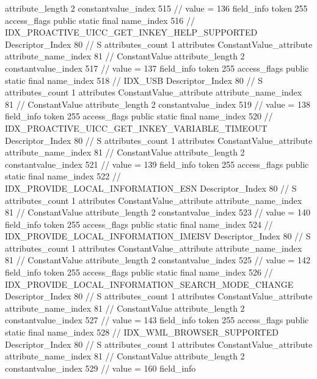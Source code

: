 {{{{{{{					attribute_length	2
					constantvalue_index	515		// value = 136
				}
				}
			}
			field_info {
				token	255
				access_flags	public static final
				name_index	516		// IDX_PROACTIVE_UICC_GET_INKEY_HELP_SUPPORTED
				Descriptor_Index	80		// S
				attributes_count	1
				attributes {
				ConstantValue_attribute {
					attribute_name_index	81		// ConstantValue
					attribute_length	2
					constantvalue_index	517		// value = 137
				}
				}
			}
			field_info {
				token	255
				access_flags	public static final
				name_index	518		// IDX_USB
				Descriptor_Index	80		// S
				attributes_count	1
				attributes {
				ConstantValue_attribute {
					attribute_name_index	81		// ConstantValue
					attribute_length	2
					constantvalue_index	519		// value = 138
				}
				}
			}
			field_info {
				token	255
				access_flags	public static final
				name_index	520		// IDX_PROACTIVE_UICC_GET_INKEY_VARIABLE_TIMEOUT
				Descriptor_Index	80		// S
				attributes_count	1
				attributes {
				ConstantValue_attribute {
					attribute_name_index	81		// ConstantValue
					attribute_length	2
					constantvalue_index	521		// value = 139
				}
				}
			}
			field_info {
				token	255
				access_flags	public static final
				name_index	522		// IDX_PROVIDE_LOCAL_INFORMATION_ESN
				Descriptor_Index	80		// S
				attributes_count	1
				attributes {
				ConstantValue_attribute {
					attribute_name_index	81		// ConstantValue
					attribute_length	2
					constantvalue_index	523		// value = 140
				}
				}
			}
			field_info {
				token	255
				access_flags	public static final
				name_index	524		// IDX_PROVIDE_LOCAL_INFORMATION_IMEISV
				Descriptor_Index	80		// S
				attributes_count	1
				attributes {
				ConstantValue_attribute {
					attribute_name_index	81		// ConstantValue
					attribute_length	2
					constantvalue_index	525		// value = 142
				}
				}
			}
			field_info {
				token	255
				access_flags	public static final
				name_index	526		// IDX_PROVIDE_LOCAL_INFORMATION_SEARCH_MODE_CHANGE
				Descriptor_Index	80		// S
				attributes_count	1
				attributes {
				ConstantValue_attribute {
					attribute_name_index	81		// ConstantValue
					attribute_length	2
					constantvalue_index	527		// value = 143
				}
				}
			}
			field_info {
				token	255
				access_flags	public static final
				name_index	528		// IDX_WML_BROWSER_SUPPORTED
				Descriptor_Index	80		// S
				attributes_count	1
				attributes {
				ConstantValue_attribute {
					attribute_name_index	81		// ConstantValue
					attribute_length	2
					constantvalue_index	529		// value = 160
				}
				}
			}
			field_info {
}}}}}
